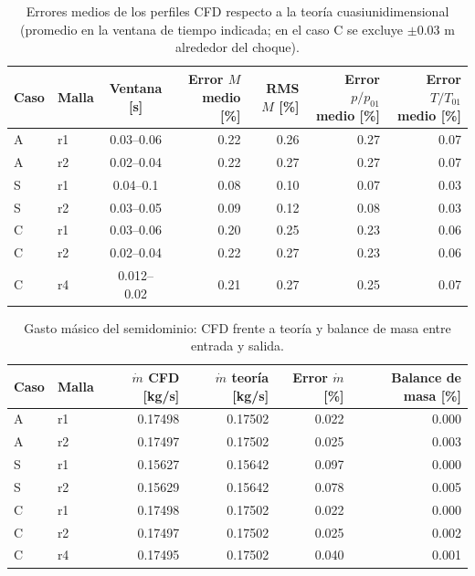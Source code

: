 \begin{table}[H]
\centering
\caption{Errores medios de los perfiles CFD respecto a la teoría cuasiunidimensional (promedio en la ventana de tiempo indicada; en el caso C se excluye $\pm0.03$ m alrededor del choque).}
\label{tab:errores-perfiles}
\footnotesize\setlength{\tabcolsep}{3pt}
\begin{tabular}{llcrrrr}
\toprule
Caso & Malla & Ventana [s] & Error $M$ medio [\%] & RMS $M$ [\%] & Error $p/p_{01}$ medio [\%] & Error $T/T_{01}$ medio [\%] \\
\midrule
A & r1 & 0.03--0.06 & 0.22 & 0.26 & 0.27 & 0.07 \\
A & r2 & 0.02--0.04 & 0.22 & 0.27 & 0.27 & 0.07 \\
S & r1 & 0.04--0.1 & 0.08 & 0.10 & 0.07 & 0.03 \\
S & r2 & 0.03--0.05 & 0.09 & 0.12 & 0.08 & 0.03 \\
C & r1 & 0.03--0.06 & 0.20 & 0.25 & 0.23 & 0.06 \\
C & r2 & 0.02--0.04 & 0.22 & 0.27 & 0.23 & 0.06 \\
C & r4 & 0.012--0.02 & 0.21 & 0.27 & 0.25 & 0.07 \\
\bottomrule
\end{tabular}
\end{table}

\begin{table}[H]
\centering
\caption{Gasto másico del semidominio: CFD frente a teoría y balance de masa entre entrada y salida.}
\label{tab:errores-gasto}
\footnotesize\setlength{\tabcolsep}{3pt}
\begin{tabular}{llrrrr}
\toprule
Caso & Malla & $\dot m$ CFD [kg/s] & $\dot m$ teoría [kg/s] & Error $\dot m$ [\%] & Balance de masa [\%] \\
\midrule
A & r1 & 0.17498 & 0.17502 & 0.022 & 0.000 \\
A & r2 & 0.17497 & 0.17502 & 0.025 & 0.003 \\
S & r1 & 0.15627 & 0.15642 & 0.097 & 0.000 \\
S & r2 & 0.15629 & 0.15642 & 0.078 & 0.005 \\
C & r1 & 0.17498 & 0.17502 & 0.022 & 0.000 \\
C & r2 & 0.17497 & 0.17502 & 0.025 & 0.002 \\
C & r4 & 0.17495 & 0.17502 & 0.040 & 0.001 \\
\bottomrule
\end{tabular}
\end{table}
